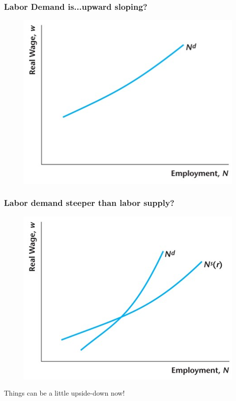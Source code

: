 \documentclass{beamer}
\begin{document}
\begin{frame}
\frametitle[alignment=center]{Labor Demand is...upward sloping?}
\begin{figure}
\centering
\includegraphics[scale=0.65]{Figures/W_Fig_13pt6.png}
\end{figure}
\end{frame}

\begin{frame}
\frametitle[alignment=center]{Labor demand steeper than labor supply?}
\begin{figure}
\centering
\includegraphics[scale=0.65]{Figures/W_Fig_13pt7.png}
\end{figure}
Things  can be a little upside-down now!
\end{frame}
\end{document}
